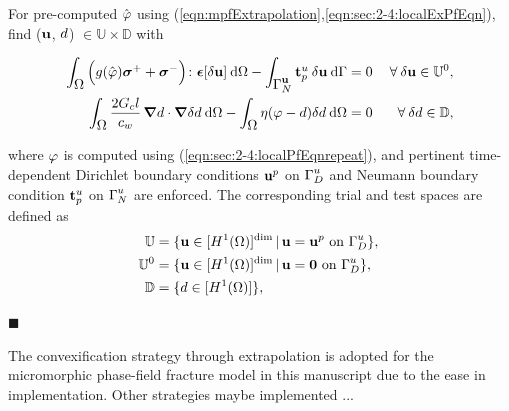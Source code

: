 \documentclass[11pt]{article}
\begin{document}
\begin{vproblem}\label{Problem4}
For pre-computed $\hat{\hbox{$\varphi$}}$ using (\ref{eqn:mpfExtrapolation},\ref{eqn:sec:2-4:localExPfEqn}), find ($\hbox{$\mathbf{u}$}$, $\hbox{$d$}$) $\in \mathbb{U} \times \mathbb{D}$ with

\begin{subequations}
\begin{align}
\int_{\hbox{$\Omega$}}^{} \Big( g(\hat{\hbox{$\varphi$}}) \hbox{$\hbox{\boldmath$\sigma$}^+$} + \hbox{$\hbox{\boldmath$\sigma$}^-$} \Big) \colon\hbox{$\hbox{\boldmath$\epsilon$}$}[\hbox{$\delta\mathbf{u}$}] \: \normalfont \text{d} \hbox{$\Omega$} - \int_{\hbox{$\hbox{$\Gamma$}_{N}^{\scriptsize{\hbox{$\mathbf{u}$}}}$}}^{} \hbox{$\mathbf{t}_{p}^{\scriptsize{\hbox{$u$}}}$} \: \hbox{$\delta\mathbf{u}$} \: \normalfont \text{d}\hbox{$\Gamma$} &= 0  & \: \forall \: \hbox{$\delta\mathbf{u}$} \in \mathbb{U}^0, \label{eqn:P4:EL_momentumbalance} \\
\int_{\hbox{$\Omega$}}^{} \dfrac{2 \hbox{$G_c$} \hbox{$l$}}{c_w} \, \hbox{\boldmath$\nabla$} \hbox{$d$}\cdot \hbox{\boldmath$\nabla$} \hbox{$\delta\hbox{$d$}$} \normalfont \: \text{d}\hbox{$\Omega$} - \int_{\hbox{$\Omega$}}^{} \eta (\hbox{$\varphi$}-\hbox{$d$}) \hbox{$\delta\hbox{$d$}$} \: \text{d}\hbox{$\Omega$} & = 0 & \: \forall \: \hbox{$\delta\hbox{$d$}$} \in \mathbb{D}, \label{eqn:P4:mpf_evolution}
\end{align}
\end{subequations}

\noindent where $\hbox{$\varphi$}$ is computed using (\ref{eqn:sec:2-4:localPfEqnrepeat}), and pertinent time-dependent Dirichlet boundary conditions $\hbox{$\mathbf{u}$}^p$ on $\hbox{$\hbox{$\Gamma$}_{D}^{\scriptsize{u}}$}$ and Neumann boundary condition $\hbox{$\mathbf{t}_{p}^{\scriptsize{u}}$}$ on $\hbox{$\hbox{$\Gamma$}_{N}^{\scriptsize{u}}$}$ are enforced. The corresponding trial and test spaces are defined as
\begin{subequations}
\begin{align}
\mathbb{U} & = \{ \hbox{$\mathbf{u}$} \in [H^1(\hbox{$\Omega$})]^{\normalfont\text{dim}} \,|\, \hbox{$\mathbf{u}$} = \hbox{$\mathbf{u}$}^p \text{ on } \hbox{$\hbox{$\Gamma$}_{D}^{\scriptsize{u}}$} \},  {\label{eqn:P4:disp_trialspace}} \\ 
\mathbb{U}^0 & = \{ \hbox{$\mathbf{u}$} \in [H^1(\hbox{$\Omega$})]^{\normalfont\text{dim}} \,|\, \hbox{$\mathbf{u}$} = \mathbf{0} \text{ on } \hbox{$\hbox{$\Gamma$}_{D}^{\scriptsize{u}}$} \},  {\label{eqn:P4:disp_testspace}} \\
\mathbb{D} & = \{ \hbox{$d$} \in [H^1(\hbox{$\Omega$})] \},  {\label{eqn:P4:trialspace}}
\end{align}
\end{subequations} 

{\color{black}\hfill $\blacksquare$}
\end{vproblem}


\begin{remark}
The convexification strategy through extrapolation is adopted for the micromorphic phase-field fracture model in this manuscript due to the ease in implementation. Other strategies maybe implemented ...
\end{remark}
\end{document}
